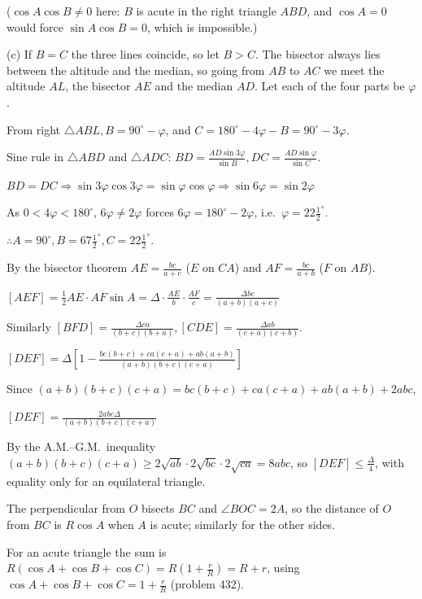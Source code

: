   ($\cos A\cos B\neq 0$ here: $B$ is acute in the right triangle $ABD$, and $\cos A = 0$ would force
  $\sin A\cos B = 0$, which is impossible.)

  (c) If $B = C$ the three lines coincide, so let $B > C$. The bisector always lies between the altitude and
  the median, so going from $AB$ to $AC$ we meet the altitude $AL$, the bisector $AE$ and the median $AD$. Let
  each of the four parts be $\varphi$.

  From right $\triangle ABL, B = 90^\circ - \varphi$, and $C = 180^\circ - 4\varphi - B = 90^\circ -
  3\varphi$.

  Sine rule in $\triangle ABD$ and $\triangle ADC$: $BD = \frac{AD\sin3\varphi}{\sin B}, DC =
  \frac{AD\sin\varphi}{\sin C}$.

  $BD = DC\Rightarrow \sin3\varphi\cos3\varphi = \sin\varphi\cos\varphi\Rightarrow \sin6\varphi =
  \sin2\varphi$

  As $0 < 4\varphi < 180^\circ$, $6\varphi\neq 2\varphi$ forces $6\varphi = 180^\circ - 2\varphi$, i.e.\
  $\varphi = 22\frac{1}{2}^\circ$.

  $\therefore A = 90^\circ, B = 67\frac{1}{2}^\circ, C = 22\frac{1}{2}^\circ$.
\item By the bisector theorem $AE = \frac{bc}{a + c}$ ($E$ on $CA$) and $AF = \frac{bc}{a + b}$ ($F$ on
  $AB$).

  $[AEF] = \frac{1}{2}AE\cdot AF\sin A = \Delta\cdot\frac{AE}{b}\cdot\frac{AF}{c} = \frac{\Delta bc}{(a + b)(a +
  c)}$

  Similarly $[BFD] = \frac{\Delta ca}{(b + c)(b + a)}, [CDE] = \frac{\Delta ab}{(c + a)(c + b)}$.

  $[DEF] = \Delta\left[1 - \frac{bc(b + c) + ca(c + a) + ab(a + b)}{(a + b)(b + c)(c + a)}\right]$

  Since $(a + b)(b + c)(c + a) = bc(b + c) + ca(c + a) + ab(a + b) + 2abc$,

  $[DEF] = \frac{2abc\Delta}{(a + b)(b + c)(c + a)}$

  By the A.M.--G.M.\ inequality $(a + b)(b + c)(c + a)\geq 2\sqrt{ab}\cdot2\sqrt{bc}\cdot2\sqrt{ca} = 8abc$, so
  $[DEF]\leq\frac{\Delta}{4}$, with equality only for an equilateral triangle.
\item The perpendicular from $O$ bisects $BC$ and $\angle BOC = 2A$, so the distance of $O$ from $BC$ is
  $R\cos A$ when $A$ is acute; similarly for the other sides.

  For an acute triangle the sum is $R(\cos A + \cos B + \cos C) = R\left(1 + \frac{r}{R}\right) = R + r$,
  using $\cos A + \cos B + \cos C = 1 + \frac{r}{R}$ (problem 432).


